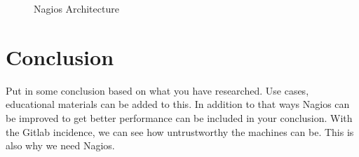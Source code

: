 \documentclass[9pt,twocolumn,twoside]{styles/osajnl}
\begin{document}
\begin{figure}[htbp]
\centering
{}
\caption{Nagios Architecture}
\label{fig:nagios-architecture}
\end{figure}



\section{Conclusion}
Put in some conclusion based on what you have researched.  Use cases,
educational materials can be added to this.  In addition to that ways
Nagios can be improved to get better performance can be included in
your conclusion. With the Gitlab incidence, we can see how
untrustworthy the machines can be. This is also why we need Nagios.





 

\appendix
\end{document}
